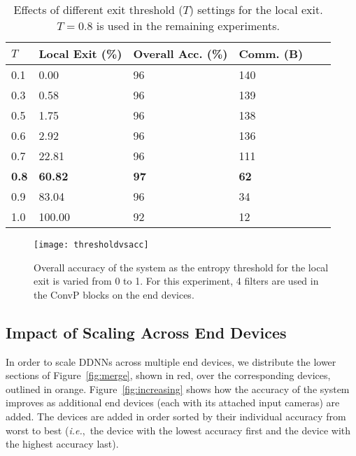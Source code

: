 \documentclass[10pt, conference, compsocconf]{IEEEtran}
\newcommand{\ie}{\emph{i.e.}}
\begin{document}
\begin{table}[H]
\centering
\caption{Effects of different exit threshold ($T$) settings for the local exit. $T=0.8$ is used in the remaining experiments.}
\label{tab:threshold}
\begin{tabular}{|l|l|l|l|l|l|}
\hline
\textbf{$T$} & \textbf{Local Exit (\%)} & \textbf{Overall Acc. (\%)} & \textbf{Comm. (B)}\\
\hline
    0.1   & 0.00    &  96  &                            140           \\
    0.3   & 0.58    &  96  &                            139           \\
    0.5   & 1.75    &  96  &                            138           \\
    0.6   & 2.92    &  96  &                            136           \\
    0.7   & 22.81   &  96  &                            111           \\
    \textbf{0.8}   & \textbf{60.82}   &  \textbf{97}  & \textbf{62}  \\
    0.9   & 83.04   &  96  &                            34           \\
    1.0   & 100.00  &  92  &                            12          \\
\hline
\end{tabular}
\end{table}

\begin{figure}
    \centering
    \texttt{[image: thresholdvsacc]}
    \caption{Overall accuracy of the system as the entropy threshold for the local exit is varied from 0 to 1. For this experiment, 4 filters are used in the ConvP blocks on the end devices.}
    \label{fig:thresholdvsacc}
\end{figure}



\subsection{Impact of Scaling Across End Devices}
\label{sec:scale-device}
In order to scale DDNNs across multiple end devices, we distribute the lower sections of Figure~\ref{fig:merge}, shown in red, over the corresponding devices, outlined in orange. Figure~\ref{fig:increasing} shows how the accuracy of the system improves as additional end devices (each with its attached input cameras) are added. The devices are added in order sorted by their individual accuracy from worst to best (\ie,~the device with the lowest accuracy first and the device with the highest accuracy last).
\end{document}
